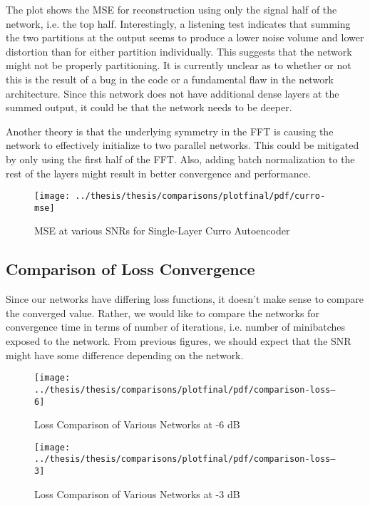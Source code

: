 The plot shows the MSE for reconstruction using only the signal half of the network, i.e. the top half. Interestingly, a listening test indicates that summing the two partitions at the output seems to produce a lower noise volume and lower distortion than for either partition individually. This suggests that the network might not be properly partitioning. It is currently unclear as to whether or not this is the result of a bug in the code or a fundamental flaw in the network architecture. Since this network does not have additional dense layers at the summed output, it could be that the network needs to be deeper.

Another theory is that the underlying symmetry in the FFT is causing the network to effectively initialize to two parallel networks. This could be mitigated by only using the first half of the FFT. Also, adding batch normalization to the rest of the layers might result in better convergence and performance.

\begin{figure}[!ht]
\centering
\texttt{[image: ../thesis/thesis/comparisons/plotfinal/pdf/curro-mse]}
\caption{MSE at various SNRs for Single-Layer Curro Autoencoder}\label{fig:curro-mse}
\end{figure}

\subsection{Comparison of Loss Convergence}

Since our networks have differing loss functions, it doesn't make sense to compare the converged value. Rather, we would like to compare the networks for convergence time in terms of number of iterations, i.e. number of minibatches exposed to the network. From previous figures, we should expect that the SNR might have some difference depending on the network.

\begin{figure}[!ht]
\centering
\texttt{[image: ../thesis/thesis/comparisons/plotfinal/pdf/comparison-loss--6]}
\caption{Loss Comparison of Various Networks at -6 dB}\label{fig:comp-loss--6}
\end{figure}

\begin{figure}[!ht]
\centering
\texttt{[image: ../thesis/thesis/comparisons/plotfinal/pdf/comparison-loss--3]}
\caption{Loss Comparison of Various Networks at -3 dB}\label{fig:comp-loss--3}
\end{figure}

